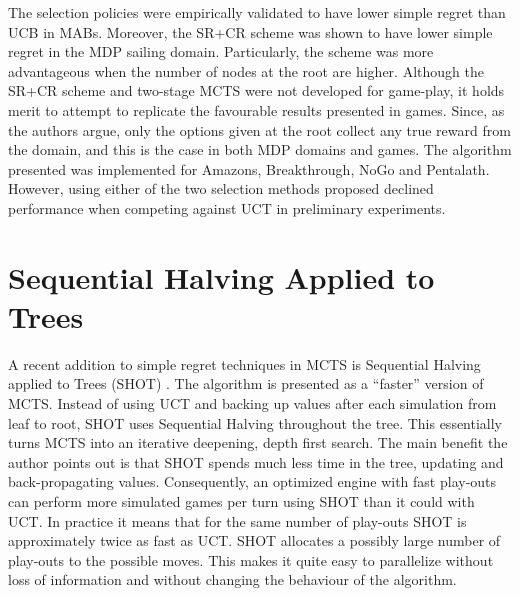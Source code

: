 \documentclass{kecsmstr}
\begin{document}
The selection policies were empirically validated to have lower simple regret than UCB in MABs. Moreover, the SR+CR scheme was shown to have lower simple regret in the MDP sailing domain. Particularly, the scheme was more advantageous when the number of nodes at the root are higher. Although the SR+CR scheme and two-stage MCTS were not developed for game-play, it holds merit to attempt to replicate the favourable results presented in games. Since, as the authors argue, only the options given at the root collect any true reward from the domain, and this is the case in both MDP domains and games. The algorithm presented was implemented for Amazons, Breakthrough, NoGo and Pentalath. However, using either of the two selection methods proposed declined performance when competing against UCT in preliminary experiments.

\section{Sequential Halving Applied to Trees}
\label{sec:SHOT}

A recent addition to simple regret techniques in MCTS is Sequential Halving applied to Trees (SHOT) . The algorithm is presented as a ``faster'' version of MCTS. Instead of using UCT and backing up values after each simulation from leaf to root, SHOT uses Sequential Halving throughout the tree. This essentially turns MCTS into an iterative deepening, depth first search. The main benefit the author points out is that SHOT spends much less time in the tree, updating and back-propagating values. Consequently, an optimized engine with fast play-outs can perform more simulated games per turn using SHOT than it could with UCT. In practice it means that for the same number of play-outs SHOT is approximately twice as fast as UCT. SHOT allocates a
possibly large number of play-outs to the possible moves. This makes it quite easy to parallelize without loss of information and without changing the behaviour of the algorithm.
\end{document}
